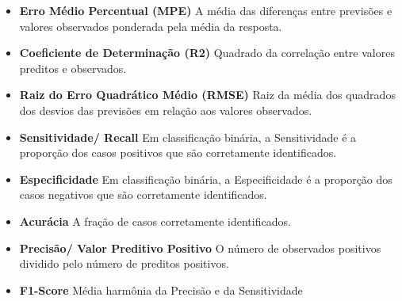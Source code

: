 \documentclass{beamer} %
\newcommand{\1}{\mathbb{I}}
\begin{document}
\begin{frame}

\begin{itemize} 
    \item \textbf{Erro Médio Percentual (MPE)} \newline
    A média das diferenças entre previsões e valores observados ponderada pela média da resposta.
    
    \item \textbf{Coeficiente de Determinação (R2)} \newline
    Quadrado da correlação entre valores preditos e observados.
    
    \item \textbf{Raiz do Erro Quadrático Médio (RMSE)} \newline
    Raiz da média dos quadrados dos desvios das previsões em relação aos valores observados.
    
\end{itemize}
\end{frame}


\begin{frame}
\begin{itemize}
    \item \textbf{Sensitividade/ Recall} \newline
    Em classificação binária, a Sensitividade é a proporção dos casos positivos que são corretamente identificados.
    \item \textbf{Especificidade} \newline
    Em classificação binária, a Especificidade é a proporção dos casos negativos que são corretamente identificados.
    \item \textbf{Acurácia} \newline
    A fração de casos corretamente identificados. 
    \item \textbf{Precisão/ Valor Preditivo Positivo} \newline
    O número de observados positivos dividido pelo número de preditos positivos.
    \item \textbf{F1-Score} \newline
    Média harmônia da Precisão e da Sensitividade
\end{itemize}
    
\end{frame}
\end{document}
